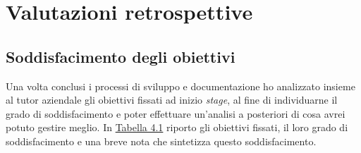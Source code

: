 
\chapter{Valutazioni retrospettive}
\label{cap:valutazioni-retrospettive}

\section{Soddisfacimento degli obiettivi}

Una volta conclusi i processi di sviluppo e documentazione ho analizzato insieme al tutor aziendale gli obiettivi fissati ad inizio \textit{stage}, al fine di individuarne il grado di soddisfacimento e poter effettuare un'analisi a posteriori di cosa avrei potuto gestire meglio. In \hyperref[tab:grado-soddisfacimento]{Tabella 4.1} riporto gli obiettivi fissati, il loro grado di soddisfacimento e una breve nota che sintetizza questo soddisfacimento. \\

